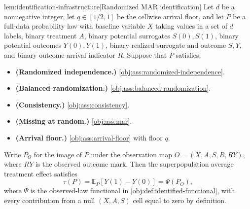 \documentclass[11pt]{article}
\begin{document}
\begin{lemmav}{lem:identification-infrastructure}[Randomized MAR identification]
Let \(d\) be a nonnegative integer, let \(q\in[1/2,1]\) be the cellwise arrival floor, and let \(P\) be a full-data probability law with baseline variable \(X\) taking values in a set of \(d\) labels, binary treatment \(A\), binary potential surrogates \(S(0),S(1)\), binary potential outcomes \(Y(0),Y(1)\), binary realized surrogate and outcome \(S,Y\), and binary outcome-arrival indicator \(R\). Suppose that \(P\) satisfies:
\begin{itemize}
\item \textbf{(Randomized independence.)} \cref{obj:ass:randomized-independence}.
\item \textbf{(Balanced randomization.)} \cref{obj:ass:balanced-randomization}.
\item \textbf{(Consistency.)} \cref{obj:ass:consistency}.
\item \textbf{(Missing at random.)} \cref{obj:ass:mar}.
\item \textbf{(Arrival floor.)} \cref{obj:ass:arrival-floor} with floor \(q\).
\end{itemize}
Write \(P_O\) for the image of \(P\) under the observation map \(O=(X,A,S,R,RY)\), where \(RY\) is the observed outcome mark. Then the superpopulation average treatment effect satisfies
\[
\tau(P)=\mathbb E_P[Y(1)-Y(0)]=\Psi(P_O),
\]
where \(\Psi\) is the observed-law functional in \cref{obj:def:identified-functional}, with every contribution from a null \((X,A,S)\) cell equal to zero by definition.
\end{lemmav}
\end{document}
